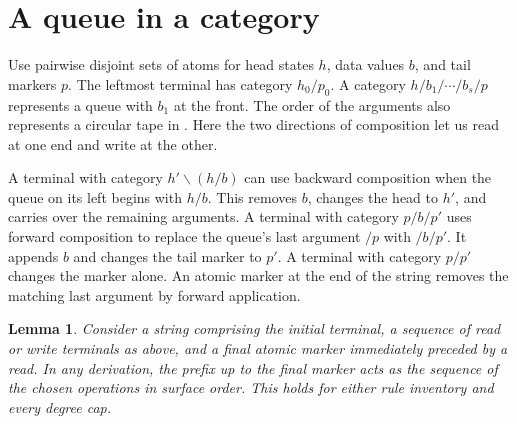 \documentclass[11pt]{article}
\newtheorem{lemma}{Lemma}
\begin{document}
\section{A queue in a category}
\label{sec:queue}

Use pairwise disjoint sets of atoms for head states \(h\), data values \(b\), and tail markers \(p\). The leftmost terminal has category \(h_0/p_0\). A category \(h/b_1/\cdots/b_s/p\) represents a queue with \(b_1\) at the front. The order of the arguments also represents a circular tape in \textcite[\S4.2.1]{kuhlmannSattaJonsson2018}. Here the two directions of composition let us read at one end and write at the other.

A terminal with category \(h'\backslash(h/b)\) can use backward composition when the queue on its left begins with \(h/b\). This removes \(b\), changes the head to \(h'\), and carries over the remaining arguments. A terminal with category \(p/b/p'\) uses forward composition to replace the queue's last argument \(/p\) with \(/b/p'\). It appends \(b\) and changes the tail marker to \(p'\). A terminal with category \(p/p'\) changes the marker alone. An atomic marker at the end of the string removes the matching last argument by forward application.

\begin{lemma}
\label{lem:bracket}
Consider a string comprising the initial terminal, a sequence of read or write terminals as above, and a final atomic marker immediately preceded by a read. In any derivation, the prefix up to the final marker acts as the sequence of the chosen operations in surface order. This holds for either rule inventory and every degree cap.
\end{lemma}
\end{document}
